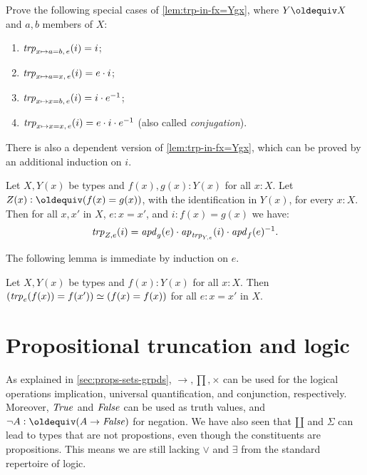 \begin{xca}\label{xca:trp-in-a/x=b/x}
Prove the following special cases of \cref{lem:trp-in-fx=Ygx},
where $Y\jdeq X$ and $a,b$ members of $X$:
\begin{enumerate}
\item $\mathord{\mathit{trp}}_{x\mapsto a=b,\,e} (i) = i$;
\item\label{xca-trp-in-a=x} $\mathord{\mathit{trp}}_{x\mapsto a=x,\,e} (i) = e\cdot i$;
\item $\mathord{\mathit{trp}}_{x\mapsto x=b,\,e} (i) = i \cdot e^{-1}$;
\item $\mathord{\mathit{trp}}_{x\mapsto x=x,\,e} (i) = e \cdot i\cdot e^{-1}$ 
(also called \emph{conjugation}).
\end{enumerate}
\end{xca}

There is also a dependent version of \cref{lem:trp-in-fx=Ygx},
which can be proved by an additional induction on $i$.

\begin{lemma}\label{lem:trp-in-fx=Yxgx}
Let $X,Y(x)$ be types and $f(x),g(x): Y(x)$ for all $x:X$. 
Let $Z(x)\defeq (f(x)=g(x))$,
with the identification in $Y(x)$, for every $x:X$. 
Then for all $x,x'$ in $X$, $e: x=x'$, and $i: f(x)=g(x)$ we have:
\[
\mathord{\mathit{trp}}_{Z, e} (i) = \mathop{{\it apd}_{g}}(e) \cdot \mathop{{\it ap}_{\mathord{\mathit{trp}}_{Y,e}}}(i) \cdot \mathop{{\it apd}_{f}}(e)^{-1}.
\]
\end{lemma}

The following lemma is immediate by induction on $e$.

\begin{lemma}\label{lem:Dan's-lemma}
Let $X,Y(x)$ be types and $f(x): Y(x)$ for all $x:X$.
Then $(\mathord{\mathit{trp}}_e(f(x))=f(x')) \simeq (f(x)=f(x))$ for all $e: x=x'$ in $X$.
\end{lemma}


\section{Propositional truncation and logic}
\label{sec:prop-trunc}

As explained in \cref{sec:props-sets-grpds}, $\to,\prod,\times$ 
can be used for the logical operations implication, 
universal quantification, and conjunction, respectively.
Moreover, $\mathop{\mathit{True}}$ and $\mathop{\mathit{False}}$ can be used as truth values,
and $\neg A \defeq (A\to\false)$ for negation.
We have also seen that ${\amalg}$ and $\Sigma$ can lead to types
that are not propostions, even though the constituents are
propositions. This means we are still lacking $\vee$ and $\exists$
from the standard repertoire of logic.

